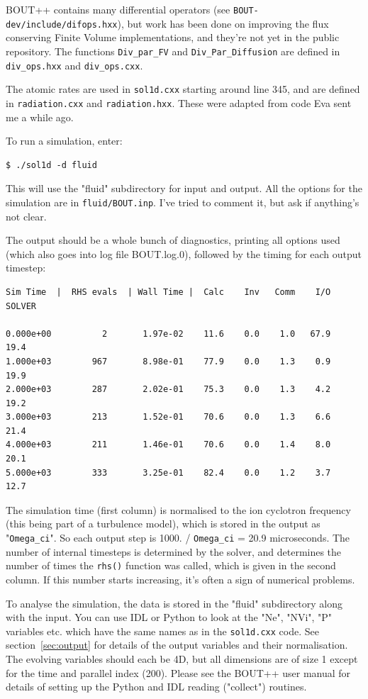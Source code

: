 \documentclass[12pt,a4paper]{article}
\begin{document}
BOUT++ contains many differential operators (see \texttt{BOUT-dev/include/difops.hxx}), but work has been done on improving the flux conserving Finite Volume implementations, and they're not yet in the public repository. The functions \texttt{Div\_par\_FV} and \texttt{Div\_Par\_Diffusion} are defined in \texttt{div\_ops.hxx} and \texttt{div\_ops.cxx}.

The atomic rates are used in \texttt{sol1d.cxx} starting around line 345, and are defined in \texttt{radiation.cxx} and \texttt{radiation.hxx}. These were adapted from code Eva sent me a while ago.


To run a simulation, enter:
\begin{verbatim}
$ ./sol1d -d fluid
\end{verbatim}
This will use the "fluid" subdirectory for input and output. All the options for the simulation are in \texttt{fluid/BOUT.inp}. I've tried to comment it, but ask if anything's not clear.

The output should be a whole bunch of diagnostics, printing all options used (which also goes into log file BOUT.log.0), followed by the timing for each output timestep:

\begin{verbatim}
Sim Time  |  RHS evals  | Wall Time |  Calc    Inv   Comm    I/O   SOLVER

0.000e+00          2       1.97e-02    11.6    0.0    1.0   67.9   19.4
1.000e+03        967       8.98e-01    77.9    0.0    1.3    0.9   19.9
2.000e+03        287       2.02e-01    75.3    0.0    1.3    4.2   19.2
3.000e+03        213       1.52e-01    70.6    0.0    1.3    6.6   21.4
4.000e+03        211       1.46e-01    70.6    0.0    1.4    8.0   20.1
5.000e+03        333       3.25e-01    82.4    0.0    1.2    3.7   12.7
\end{verbatim}

The simulation time (first column) is normalised to the ion cyclotron frequency (this being part of a turbulence model),
which is stored in the output as  "\texttt{Omega\_ci}". So each output step is 1000. / \texttt{Omega\_ci} = 20.9 microseconds.
The number of internal timesteps is determined by the solver, and determines the number of times the \texttt{rhs()}
function was called, which is given in the second column. If this number starts increasing, it's often a sign of numerical problems.

To analyse the simulation, the data is stored in the "fluid" subdirectory along with the input. You can use IDL or Python to look at the "Ne", "NVi", "P" variables etc. which have the same names as in the \texttt{sol1d.cxx} code. See section~\ref{sec:output} for
details of the output variables and their normalisation. The evolving variables should each be 4D, but all dimensions are of size 1 except for the time and parallel index (200). Please see the BOUT++ user manual for details of setting up the Python and IDL reading ("collect") routines. 
\end{document}
